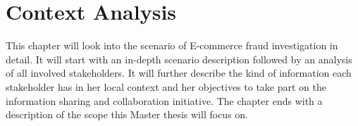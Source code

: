 
\chapter{Context Analysis} %
\label{cha:context_analysis}

This chapter will look into the scenario of E-commerce fraud investigation in detail.
It will start with an in-depth scenario description followed by an analysis of all involved stakeholders.
It will further describe the kind of information each stakeholder has in her local context and her objectives to take
part on the information sharing and collaboration initiative. The chapter ends with a description of the scope
this Master thesis will focus on.









